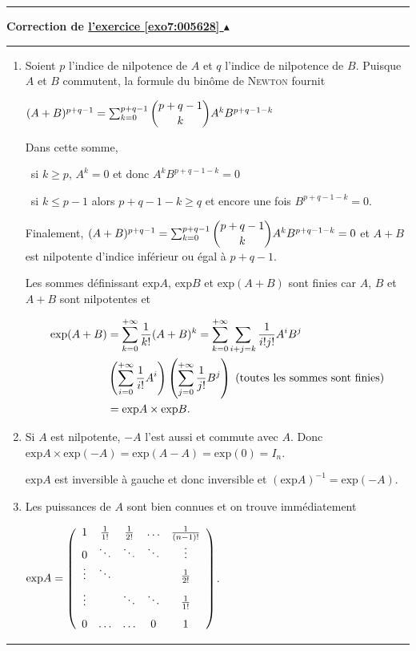 \documentclass[11pt,a4paper]{article}
\newcounter{exo}
\newcommand{\correction}[1]{\hypertarget{cor7:#1}{}\label{cor7:#1}{\bf Correction de \hyperlink{exo7:#1}{l'exercice \ref{exo7:#1} $\blacktriangle$}}\vspace{1mm}\hrule\vspace{1mm}}
\newcommand{\fincorrection}{\vspace{1mm}\hrule\vspace*{7mm}}
\begin{document}
\fincorrection
\correction{005628}
\begin{enumerate}
 \item  Soient $p$ l'indice de nilpotence de $A$ et $q$ l'indice de nilpotence de $B$. Puisque $A$ et $B$ commutent, la formule du binôme de \textsc{Newton} fournit

\begin{center}
$(A+B)^{p+q-1}=\sum_{k=0}^{p+q-1}\dbinom{p+q-1}{k}A^kB^{p+q-1-k}$ 
\end{center}

Dans cette somme, 

\textbullet~si $k\geqslant p$, $A^k=0$ et donc $A^kB^{p+q-1-k}= 0$

\textbullet~si $k\leqslant p-1$ alors $p+q-1-k\geqslant q$ et encore une fois $B^{p+q-1-k}= 0$.

Finalement, $(A+B)^{p+q-1}=\sum_{k=0}^{p+q-1}\dbinom{p+q-1}{k}A^kB^{p+q-1-k}=0$ et $A+B$ est nilpotente d'indice inférieur ou égal à $p+q-1$. 

Les sommes définissant $\text{exp}A$, $\text{exp}B$ et $\text{exp}(A+B)$ sont finies car $A$, $B$ et $A+B$ sont nilpotentes et

\begin{align*}\ensuremath
\text{exp}(A+B)&=\sum_{k=0}^{+\infty}\frac{1}{k!}(A+B)^k=\sum_{k=0}^{+\infty}\sum_{i+j=k}^{}\frac{1}{i!j!}A^iB^j\\
 &\left(\sum_{i=0}^{+\infty}\frac{1}{i!}A^i\right)\left(\sum_{j=0}^{+\infty}\frac{1}{j!}B^j\right)\;(\text{toutes les sommes sont finies})\\
 &=\text{exp}A\times\text{exp}B.
\end{align*}

\item  Si $A$ est nilpotente, $-A$ l'est aussi et commute avec $A$. Donc $\text{exp}A\times\text{exp}(-A)=\text{exp}(A-A)=\text{exp}(0)=I_n$.

$\text{exp}A$ est inversible à gauche et donc inversible et $(\text{exp}A)^{-1}=\text{exp}(-A)$.

\item  Les puissances de $A$ sont bien connues et on trouve immédiatement

\begin{center}
$\text{exp}A=\left(
\begin{array}{ccccc}
1&\frac{1}{1!}&\frac{1}{2!}&\ldots&\frac{1}{(n-1)!}\\
0&\ddots&\ddots&\ddots&\vdots\\
\vdots&\ddots& & &\frac{1}{2!}\\
\vdots& &\ddots&\ddots&\rule[-4mm]{0mm}{11mm}\frac{1}{1!}\\
0&\ldots&\ldots&0&1
\end{array}
\right)$.
\end{center}
\end{enumerate}
\fincorrection
\end{document}
